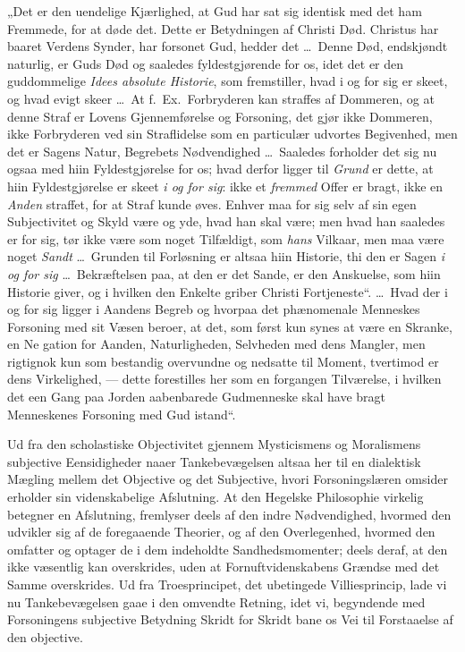 \documentclass[12pt]{book}
\begin{document}
{„Det er den uendelige Kjærlighed, at Gud har sat sig identisk med
det ham Fremmede, for at døde det. Dette er Betydningen af Christi
Død. Christus har baaret Verdens Synder, har forsonet Gud, hedder
det \dots\ Denne Død, endskjøndt naturlig, er Guds Død og saaledes
fyldestgjørende for os, idet det er den guddommelige \emph{Idees
absolute Historie}, som fremstiller, hvad i og for sig er skeet, og
hvad evigt skeer \dots\ At f.\ Ex.\ Forbryderen kan straffes af
Dommeren, og at denne Straf er Lovens Gjennemførelse og Forsoning,
det gjør ikke Dommeren, ikke Forbryderen ved sin Straflidelse som en
particulær udvortes Begivenhed, men det er Sagens Natur, Begrebets
Nødvendighed \dots\ Saaledes forholder det sig nu ogsaa med hiin
Fyldestgjørelse for os; hvad derfor ligger til \emph{Grund} er
dette, at hiin Fyldestgjørelse er skeet \emph{i og for sig}: ikke et
\emph{fremmed} Offer er bragt, ikke en \emph{Anden} straffet, for at
Straf kunde øves. Enhver maa for sig selv af sin egen Subjectivitet
og Skyld være og yde, hvad han skal være; men hvad han saaledes er
for sig, tør ikke være som noget Tilfældigt, som \emph{hans}
Vilkaar, men maa være noget \emph{Sandt} \dots\ Grunden til
Forløsning er altsaa hiin Historie, thi den er Sagen \emph{i og for
sig} \dots\ Bekræftelsen paa, at den er det Sande, er den Anskuelse,
som hiin Historie giver, og i hvilken den Enkelte griber Christi
Fortjeneste“.} \dots\ Hvad der
i og for sig ligger i Aandens Begreb og hvorpaa det phænomenale
Menneskes Forsoning med sit Væsen beroer, at det, som først kun
synes at være en Skranke, en Ne\-
gation for Aanden, Naturligheden, Selvheden med dens Mangler, men
rigtignok kun som bestandig overvundne og nedsatte til Moment,
tvertimod er dens Virkelighed, --- dette forestilles her som en
forgangen Tilværelse, i hvilken det een Gang paa Jorden aabenbarede
Gudmenneske skal have bragt Menneskenes Forsoning med Gud istand“.

Ud fra den scholastiske Objectivitet gjennem Mysticismens og
Moralismens subjective Eensidigheder naaer Tankebevægelsen altsaa
her til en dialektisk Mægling mellem det Objective og det
Subjective, hvori Forsoningslæren omsider erholder sin
videnskabelige Afslutning. At den Hegelske Philosophie virkelig
betegner en Afslutning, fremlyser deels af den indre Nødvendighed,
hvormed den udvikler sig af de foregaaende Theorier, og af den
Overlegenhed, hvormed den omfatter og optager de i dem indeholdte
Sandhedsmomenter; deels deraf, at den ikke væsentlig kan
overskrides, uden at Fornuftvidenskabens Grændse med det Samme
overskrides. Ud fra Troesprincipet, det ubetingede Villiesprincip,
lade vi nu Tankebevægelsen gaae i den omvendte Retning, idet vi,
begyndende med Forsoningens subjective Betydning Skridt for Skridt
bane os Vei til Forstaaelse af den objective.
\end{document}
